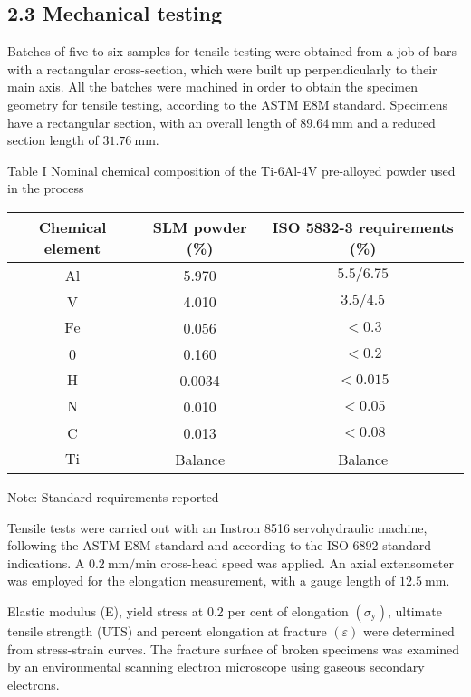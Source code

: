 \documentclass[10pt]{article}
\begin{document}
\subsection*{2.3 Mechanical testing}
Batches of five to six samples for tensile testing were obtained from a job of bars with a rectangular cross-section, which were built up perpendicularly to their main axis. All the batches were machined in order to obtain the specimen geometry for tensile testing, according to the ASTM E8M standard. Specimens have a rectangular section, with an overall length of $89.64 \mathrm{~mm}$ and a reduced section length of $31.76 \mathrm{~mm}$.

Table I Nominal chemical composition of the Ti-6Al-4V pre-alloyed powder used in the process

\begin{center}
\begin{tabular}{|c|c|c|}
\hline
Chemical element & SLM powder (\%) & ISO 5832-3 requirements (\%) \\
\hline
Al & 5.970 & $5.5 / 6.75$ \\
\hline
V & 4.010 & $3.5 / 4.5$ \\
\hline
$\mathrm{Fe}$ & 0.056 & $<0.3$ \\
\hline
0 & 0.160 & $<0.2$ \\
\hline
$\mathrm{H}$ & 0.0034 & $<0.015$ \\
\hline
$\mathrm{N}$ & 0.010 & $<0.05$ \\
\hline
C & 0.013 & $<0.08$ \\
\hline
$\mathrm{Ti}$ & Balance & Balance \\
\hline
\end{tabular}
\end{center}

Note: Standard requirements reported

Tensile tests were carried out with an Instron 8516 servohydraulic machine, following the ASTM E8M standard and according to the ISO 6892 standard indications. A $0.2 \mathrm{~mm} / \mathrm{min}$ cross-head speed was applied. An axial extensometer was employed for the elongation measurement, with a gauge length of $12.5 \mathrm{~mm}$.

Elastic modulus (E), yield stress at 0.2 per cent of elongation $\left(\sigma_{\mathrm{y}}\right)$, ultimate tensile strength (UTS) and percent elongation at fracture $(\varepsilon)$ were determined from stress-strain curves. The fracture surface of broken specimens was examined by an environmental scanning electron microscope using gaseous secondary electrons.
\end{document}
